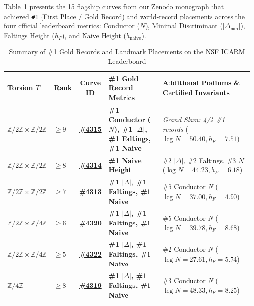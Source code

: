 \documentclass[10pt,a4paper]{article}
\theoremstyle{plain}
\theoremstyle{definition}
\theoremstyle{remark}
\begin{document}
Table~\ref{tab:gold_records} presents the 15 flagship curves from our Zenodo monograph \cite{dagli2026zenodo} that achieved \texttt{\#1} (First Place / Gold Record) and world-record placements across the four official leaderboard metrics: Conductor ($N$), Minimal Discriminant ($|\Delta_{\min}|$), Faltings Height ($h_F$), and Naive Height ($h_{\text{naive}}$).

\begin{table}[htbp]
\centering
\footnotesize
\setlength{\tabcolsep}{4pt}
\caption{Summary of \#1 Gold Records and Landmark Placements on the NSF ICARM Leaderboard}
\label{tab:gold_records}
\begin{tabularx}{\textwidth}{llcp{4.8cm}X}
\toprule
\textbf{Torsion $T$} & \textbf{Rank} & \textbf{Curve ID} & \textbf{\#1 Gold Record Metrics} & \textbf{Additional Podiums \& Certified Invariants} \\
\midrule
$\mathbb{Z}/2\mathbb{Z} \times \mathbb{Z}/2\mathbb{Z}$ & $\ge 9$ & \href{https://elliptic-rank.icarm.cloud/curve/4315}{\textbf{\#4315}} & \textbf{\#1 Conductor ($N$), \#1 $|\Delta|$, \#1 Faltings, \#1 Naive} & \emph{Grand Slam: 4/4 \#1 records} ($\log N = 50.40, h_F = 7.51$) \\
\addlinespace[1.5pt]
$\mathbb{Z}/2\mathbb{Z} \times \mathbb{Z}/2\mathbb{Z}$ & $\ge 8$ & \href{https://elliptic-rank.icarm.cloud/curve/4314}{\textbf{\#4314}} & \textbf{\#1 Naive Height} & \#2 $|\Delta|$, \#2 Faltings, \#3 $N$ ($\log N = 44.23, h_F = 6.18$) \\
\addlinespace[1.5pt]
$\mathbb{Z}/2\mathbb{Z} \times \mathbb{Z}/2\mathbb{Z}$ & $\ge 7$ & \href{https://elliptic-rank.icarm.cloud/curve/4313}{\textbf{\#4313}} & \textbf{\#1 $|\Delta|$, \#1 Faltings, \#1 Naive} & \#6 Conductor $N$ ($\log N = 37.00, h_F = 4.90$) \\
\addlinespace[1.5pt]
$\mathbb{Z}/2\mathbb{Z} \times \mathbb{Z}/4\mathbb{Z}$ & $\ge 6$ & \href{https://elliptic-rank.icarm.cloud/curve/4320}{\textbf{\#4320}} & \textbf{\#1 $|\Delta|$, \#1 Faltings, \#1 Naive} & \#5 Conductor $N$ ($\log N = 39.78, h_F = 8.68$) \\
\addlinespace[1.5pt]
$\mathbb{Z}/2\mathbb{Z} \times \mathbb{Z}/4\mathbb{Z}$ & $\ge 5$ & \href{https://elliptic-rank.icarm.cloud/curve/4322}{\textbf{\#4322}} & \textbf{\#1 $|\Delta|$, \#1 Faltings, \#1 Naive} & \#2 Conductor $N$ ($\log N = 27.61, h_F = 5.74$) \\
\addlinespace[1.5pt]
$\mathbb{Z}/4\mathbb{Z}$ & $\ge 8$ & \href{https://elliptic-rank.icarm.cloud/curve/4319}{\textbf{\#4319}} & \textbf{\#1 $|\Delta|$, \#1 Faltings, \#1 Naive} & \#3 Conductor $N$ ($\log N = 48.33, h_F = 8.25$) \\

\end{tabularx}
\end{table}
\end{document}
